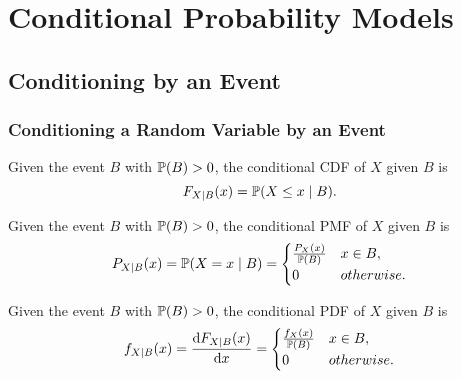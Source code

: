 \chapter{Conditional Probability Models}

\section{Conditioning by an Event}
\subsection{Conditioning a Random Variable by an Event}
\begin{definition}
    Given the event $B$ with $\P{B} > 0$, the conditional \textnormal{CDF} of $X$ given $B$ is
    \[F_{X\mid B}(x)=\P{X\leq x\mid B}.\]
\end{definition}

\begin{definition}
    Given the event $B$ with $\P{B} > 0$, the conditional \textnormal{PMF} of $X$ given $B$ is
    \[P_{X\mid B}(x)=\P{X=x\mid B} ={
        \begin{cases}
            \frac{P_{X}(x)}{\P{B}} & x\in B, \\
            0 & otherwise.
        \end{cases}
    }\]
\end{definition}

\begin{definition}
    Given the event $B$ with $\P{B} > 0$, the conditional \textnormal{PDF} of $X$ given $B$ is
    \[f_{X\mid B}(x)=\frac{\mathop{}\!\mathrm{d} F_{X\mid B}(x)}{\mathop{}\!\mathrm{d} x}={
        \begin{cases}
            \frac{f_{X}(x)}{\mathbb{P}\left\lparen B\right\rparen} & x\in B, \\
            0 & otherwise.
        \end{cases}
    }\]
\end{definition}


